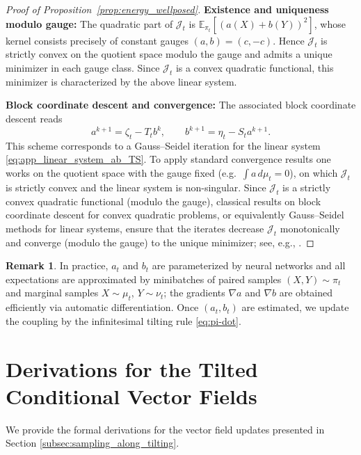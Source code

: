 \documentclass[11pt]{article}
\theoremstyle{definition}
\newtheorem{remark}[theorem]{Remark}
\numberwithin{equation}{section}%
\begin{document}
{\begin{proof}[Proof of Proposition~\ref{prop:energy_wellposed}]
\noindent\textbf{Existence and uniqueness modulo gauge:}
The quadratic part of $\mathcal J_t$ is $\mathbb E_{\pi_t}[(a(X)+b(Y))^2]$, whose kernel consists precisely of constant gauges $(a,b)=(c,-c)$. Hence $\mathcal J_t$ is strictly convex on the quotient space modulo the gauge and admits a unique minimizer in each gauge class. Since $\mathcal J_t$ is a convex quadratic functional, this minimizer is characterized by the above linear system.

\noindent\textbf{Block coordinate descent and convergence:}
The associated block coordinate descent reads
\[
a^{k+1}=\zeta_t-T_t b^{k},
\qquad
b^{k+1}=\eta_t-S_t a^{k+1}.
\]
This scheme corresponds to a Gauss--Seidel iteration for the linear system \eqref{eq:app_linear_system_ab_TS}. To apply standard convergence results one works on the quotient space with the gauge fixed (e.g.\ $\int a\,d\mu_t=0$), on which $\mathcal{J}_t$ is strictly convex and the linear system is non-singular.
Since $\mathcal J_t$ is a strictly convex quadratic functional (modulo the gauge), classical results on block coordinate descent for convex quadratic problems, or equivalently Gauss--Seidel methods for linear systems, ensure that the iterates decrease $\mathcal J_t$ monotonically and converge (modulo the gauge) to the unique minimizer; see, e.g., \cite{bertsekas1997nonlinear,tseng2001convergence}.
\end{proof}


\begin{remark}
In practice, $a_t$ and $b_t$ are parameterized by neural networks and all expectations are approximated by minibatches of paired samples $(X,Y)\sim\pi_t$ and marginal samples $X\sim\mu_t$, $Y\sim\nu_t$; the gradients $\nabla a$ and
$\nabla b$ are obtained efficiently via automatic differentiation. Once $(a_t,b_t)$ are estimated, we update the coupling by the infinitesimal tilting rule  \eqref{eq:pi-dot}.
\end{remark}

\section{Derivations for the Tilted Conditional Vector Fields}
\label{app:tilted_vector_fields_derivation}
We provide the formal derivations for the vector field updates presented in Section \ref{subsec:sampling_along_tilting}.

}
\end{document}
